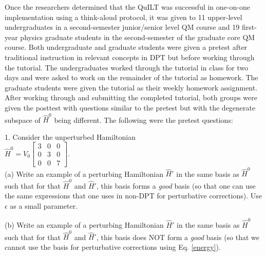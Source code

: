 \documentclass[aps,pra,showpacs,showkeys,twocolumn,groupedaddress]{revtex4-1}
\begin{document}
Once the researchers determined that the QuILT was successful in one-on-one implementation using a think-aloud protocol, it was given to 11 upper-level undergraduates in a second-semester junior/senior level QM course and 19 first-year physics graduate students in the second-semester of the graduate core QM course.  Both undergraduate and graduate students were given a pretest after traditional instruction in relevant concepts in DPT but before working through the tutorial.  The undergraduates worked through the tutorial in class for two days and were asked to work on the remainder of the tutorial as homework.  The graduate students were given the tutorial as their weekly homework assignment.  After working through and submitting the completed tutorial, both groups were given the posttest with questions similar to the pretest but with the degenerate subspace of $\hat{H}^0$ being different.  The following were the pretest questions:

1. Consider the unperturbed Hamiltonian \\
$\hat{H}^0 =  V_0
\left[
\begin{array}{rrr}
3&0&0\\
0&3&0\\
0&0&7
\end{array}
\right].$\\
(a)  Write an example of a perturbing Hamiltonian $\hat{H}'$ in the same basis as $\hat{H}^0$ such that for that $\hat{H}^0$ and $\hat{H}'$, this basis forms a {\it good} basis (so that one can use the same expressions that one uses in non-DPT for perturbative corrections). 
Use $\epsilon$ as a small parameter.


(b)  Write an example of a perturbing Hamiltonian $\hat{H}'$ in the same basis as $\hat{H}^0$ such that for that $\hat{H}^0$ and $\hat{H}'$, this basis does NOT form a {\it good} basis 
(so that we cannot use the basis for perturbative corrections using Eq. \ref{energy}).
\end{document}
